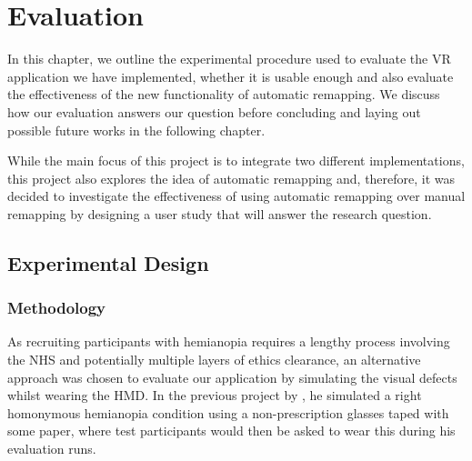 \documentclass{l4proj}
\begin{document}
\chapter{Evaluation}
\label{sec:Eval}
In this chapter, we outline the experimental procedure used to evaluate the VR application we have implemented, whether it is usable enough and also evaluate the effectiveness of the new functionality of automatic remapping. We discuss how our evaluation answers our question before concluding and laying out possible future works in the following chapter.

While the main focus of this project is to integrate two different implementations, this project also explores the idea of automatic remapping and, therefore, it was decided to investigate the effectiveness of using automatic remapping over manual remapping by designing a user study that will answer the research question.





\section{Experimental Design}

\subsection{Methodology}
As recruiting participants with hemianopia requires a lengthy process involving the NHS and potentially multiple layers of ethics clearance, an alternative approach was chosen to evaluate our application by simulating the visual defects whilst wearing the HMD. In the previous project by \cite{Russell2023}, he simulated a right homonymous hemianopia condition using a non-prescription glasses taped with some paper, where test participants would then be asked to wear this during his evaluation runs. 
\end{document}
